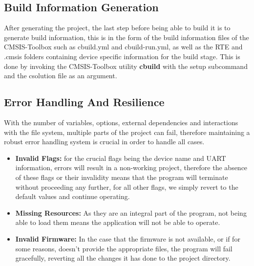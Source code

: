 \subsection{Build Information Generation}
After generating the project, the last step before being able to build it is to generate build information, this is in the form of the build information files of the CMSIS-Toolbox such as cbuild.yml and cbuild-run.yml, as well as the RTE and .cmsis folders containing device specific information for the build stage. This is done by invoking the CMSIS-Toolbox utility \textbf{cbuild} with the setup subcommand and the csolution file as an argument.
\subsection{Error Handling And Resilience}
With the number of variables, options, external dependencies and interactions with the file system, multiple parts of the project can fail, therefore maintaining a robust error handling system is crucial in order to handle all cases.
\begin{itemize}
    \item \textbf{Invalid Flags:} for the crucial flags being the device name and UART information, errors will result in a non-working project, therefore the absence of these flags or their invalidity means that the program will terminate without proceeding any further, for all other flags, we simply revert to the default values and continue operating.
    \item \textbf{Missing Resources:} As they are an integral part of the program, not being able to load them means the application will not be able to operate.
    \item \textbf{Invalid Firmware:} In the case that the firmware is not available, or if for some reasons, doesn't provide the appropriate files, the program will fail gracefully, reverting all the changes it has done to the project directory.
\end{itemize}
